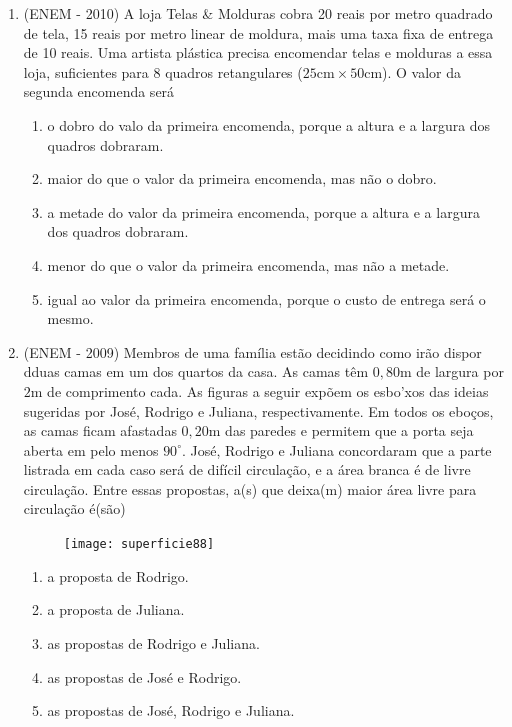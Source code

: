 \begin{enumerate}
  \item (ENEM - 2010) A loja Telas \& Molduras cobra 20 reais por metro quadrado de tela, 15 reais por metro linear de moldura, mais uma taxa fixa de entrega de 10 reais. Uma artista plástica precisa encomendar telas e molduras a essa loja, suficientes para 8 quadros retangulares ($25\text{cm}\times50\text{cm}$). O valor da segunda encomenda será
  \begin{enumerate}
    \item o dobro do valo da primeira encomenda, porque a altura e a largura dos quadros dobraram.
    \item maior do que o valor da primeira encomenda, mas não o dobro.
    \item a metade do valor da primeira encomenda, porque a altura e a largura dos quadros dobraram.
    \item menor do que o valor da primeira encomenda, mas não a metade.
    \item igual ao valor da primeira encomenda, porque o custo de entrega será o mesmo.
  \end{enumerate}


  \item (ENEM - 2009) Membros de uma família estão decidindo como irão dispor dduas camas em um dos quartos da casa. As camas têm $0{,}80$m de largura por $2$m de comprimento cada. As figuras a seguir expõem os esbo'xos das ideias sugeridas por José, Rodrigo e Juliana, respectivamente. Em todos os eboços, as camas ficam afastadas $0{,}20$m das paredes e permitem que a porta seja aberta em pelo menos $90^{\circ}$. José, Rodrigo e Juliana concordaram que a parte listrada em cada caso será de difícil circulação, e a área branca é de livre circulação. Entre essas propostas, a(s) que deixa(m) maior área livre para circulação é(são)
  \begin{figure}[H]
  \centering

  \texttt{[image: superficie88]}
  \end{figure}
  \begin{enumerate}
    \item a proposta de Rodrigo.
    \item a proposta de Juliana.
    \item as propostas de Rodrigo e Juliana.
    \item as propostas de José e Rodrigo.
    \item as propostas de José, Rodrigo e Juliana.
  \end{enumerate}


\end{enumerate}
